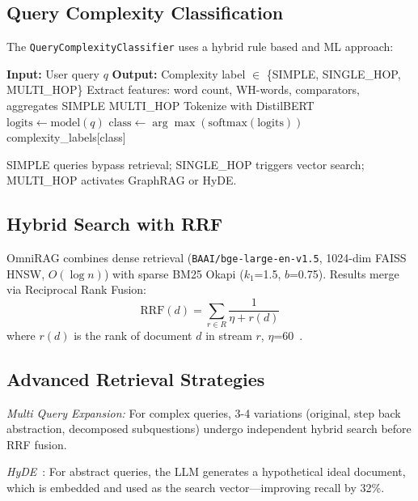 \documentclass[conference]{IEEEtran}
\begin{document}
\subsection{Query Complexity Classification}

The \texttt{QueryComplexityClassifier} uses a hybrid rule based and ML approach:

\begin{algorithm}[htbp]
\caption{Query Complexity Classification}
\label{alg:classify}
\begin{algorithmic}[1]
\STATE \textbf{Input:} User query $q$
\STATE \textbf{Output:} Complexity label $\in$ \{SIMPLE, SINGLE\_HOP, MULTI\_HOP\}
\STATE
\STATE Extract features: word count, WH-words, comparators, aggregates
    \RETURN SIMPLE
    \RETURN MULTI\_HOP
\ELSE
    \STATE Tokenize with DistilBERT
    \STATE $\text{logits} \leftarrow \text{model}(q)$
    \STATE $\text{class} \leftarrow \arg\max(\text{softmax}(\text{logits}))$
    \RETURN complexity\_labels[class]
\ENDIF
\end{algorithmic}
\end{algorithm}

SIMPLE queries bypass retrieval; SINGLE\_HOP triggers vector search; MULTI\_HOP activates GraphRAG or HyDE.

\subsection{Hybrid Search with RRF}

OmniRAG combines dense retrieval (\texttt{BAAI/bge-large-en-v1.5}, 1024-dim FAISS HNSW, $O(\log n)$) with sparse BM25 Okapi ($k_1$=1.5, $b$=0.75). Results merge via Reciprocal Rank Fusion:
\begin{equation}
\text{RRF}(d) = \sum_{r \in R} \frac{1}{\eta + r(d)}
\end{equation}
where $r(d)$ is the rank of document $d$ in stream $r$, $\eta$=60~\cite{cormack2009reciprocal}.

\subsection{Advanced Retrieval Strategies}

\textit{Multi Query Expansion:} For complex queries, 3-4 variations (original, step back abstraction, decomposed subquestions) undergo independent hybrid search before RRF fusion.

\textit{HyDE}~\cite{gao2022precise}: For abstract queries, the LLM generates a hypothetical ideal document, which is embedded and used as the search vector—improving recall by 32\%.
\end{document}
